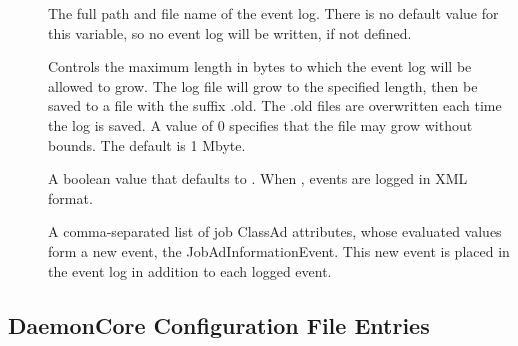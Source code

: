 \begin{description}

\item[] \label{param:EventLog}
  The full path and file name of the event log.
  There is no default value for this variable,
  so no event log will be written, if not defined.

\item[] \label{param:MaxEventLog}
  Controls the maximum length in bytes to which the event log
  will be allowed to grow. The log file will grow to the specified length,
  then be saved to a file with the suffix .old.
  The .old  files are overwritten each time the log is saved.
  A value of 0 specifies that the file may grow without bounds.
  The default is 1 Mbyte.
  
\item[] \label{param:EventLogUseXML}
  A boolean value that defaults to .
  When , events are logged in XML format.

\item[]
  \label{param:EventLogJobAdInformationAttrs}
  A comma-separated list of job ClassAd attributes,
  whose evaluated values form a new event, the JobAdInformationEvent.
  This new event is placed in the event log in addition to each logged event.

\end{description}

\subsection{\label{sec:DaemonCore-Config-File-Entries}DaemonCore Configuration File Entries} 

